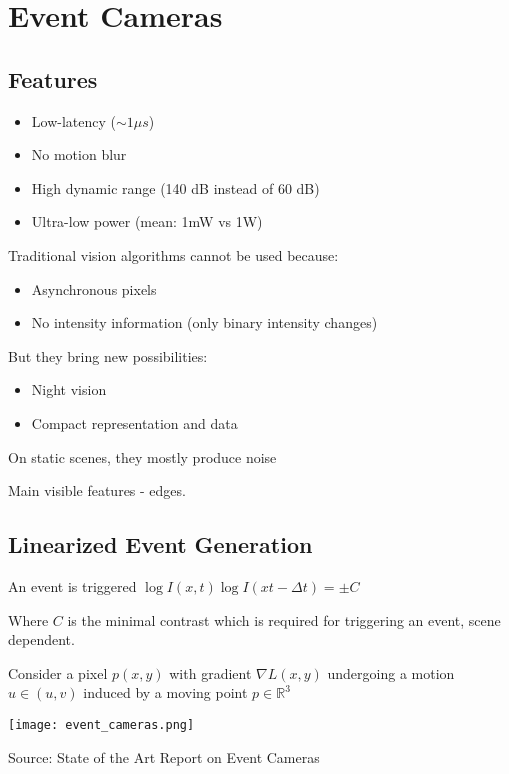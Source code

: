 \section{Event Cameras}

\subsection{Features}

\begin{itemize}
\item Low-latency ($\sim1 \mu s$)
\item No motion blur
\item High dynamic range (140 dB instead of 60 dB)
\item Ultra-low power (mean: 1mW vs 1W)
\end{itemize}

Traditional vision algorithms cannot be used because:
\begin{itemize}
\item Asynchronous pixels
\item No intensity information (only binary intensity changes)
\end{itemize}

But they bring new possibilities:
\begin{itemize}
\item Night vision
\item Compact representation and data
\end{itemize}

On static scenes, they mostly produce noise

Main visible features - edges. 

\subsection{Linearized Event Generation}

An event is triggered $\log I(x,t) \log I(xt-\Delta t)=\pm C$

Where $C$ is the minimal contrast which is required for triggering an event, scene dependent.

Consider a pixel $p(x,y)$ with gradient $\nabla L(x,y)$ undergoing a motion $u\in(u,v)$ induced by a moving point $p \in\mathbb{R}^3 $

\texttt{[image: event\_cameras.png]}

Source: State of the Art Report on Event Cameras

